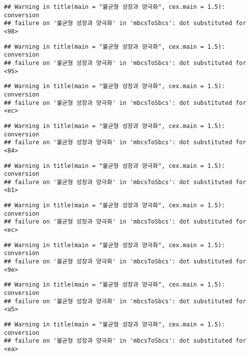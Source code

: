 \documentclass[
]{article}
\begin{document}
\begin{verbatim}
## Warning in title(main = "불균형 성장과 양극화", cex.main = 1.5): conversion
## failure on '불균형 성장과 양극화' in 'mbcsToSbcs': dot substituted for <98>
\end{verbatim}

\begin{verbatim}
## Warning in title(main = "불균형 성장과 양극화", cex.main = 1.5): conversion
## failure on '불균형 성장과 양극화' in 'mbcsToSbcs': dot substituted for <95>
\end{verbatim}

\begin{verbatim}
## Warning in title(main = "불균형 성장과 양극화", cex.main = 1.5): conversion
## failure on '불균형 성장과 양극화' in 'mbcsToSbcs': dot substituted for <ec>
\end{verbatim}

\begin{verbatim}
## Warning in title(main = "불균형 성장과 양극화", cex.main = 1.5): conversion
## failure on '불균형 성장과 양극화' in 'mbcsToSbcs': dot substituted for <84>
\end{verbatim}

\begin{verbatim}
## Warning in title(main = "불균형 성장과 양극화", cex.main = 1.5): conversion
## failure on '불균형 성장과 양극화' in 'mbcsToSbcs': dot substituted for <b1>
\end{verbatim}

\begin{verbatim}
## Warning in title(main = "불균형 성장과 양극화", cex.main = 1.5): conversion
## failure on '불균형 성장과 양극화' in 'mbcsToSbcs': dot substituted for <ec>
\end{verbatim}

\begin{verbatim}
## Warning in title(main = "불균형 성장과 양극화", cex.main = 1.5): conversion
## failure on '불균형 성장과 양극화' in 'mbcsToSbcs': dot substituted for <9e>
\end{verbatim}

\begin{verbatim}
## Warning in title(main = "불균형 성장과 양극화", cex.main = 1.5): conversion
## failure on '불균형 성장과 양극화' in 'mbcsToSbcs': dot substituted for <a5>
\end{verbatim}

\begin{verbatim}
## Warning in title(main = "불균형 성장과 양극화", cex.main = 1.5): conversion
## failure on '불균형 성장과 양극화' in 'mbcsToSbcs': dot substituted for <ea>
\end{verbatim}
\end{document}

